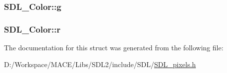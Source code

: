 \subsubsection[{\texorpdfstring{g}{g}}]{ S\+D\+L\+\_\+\+Color\+::g}\hypertarget{struct_s_d_l___color_ae29d881bf740cfa7078b36e07f85d298}{}\label{struct_s_d_l___color_ae29d881bf740cfa7078b36e07f85d298}
\subsubsection[{\texorpdfstring{r}{r}}]{ S\+D\+L\+\_\+\+Color\+::r}\hypertarget{struct_s_d_l___color_a0bb975b6829524133fdd3c6060cfa63d}{}\label{struct_s_d_l___color_a0bb975b6829524133fdd3c6060cfa63d}


The documentation for this struct was generated from the following file\+:\begin{DoxyCompactItemize}
\item 
D\+:/\+Workspace/\+M\+A\+C\+E/\+Libs/\+S\+D\+L2/include/\+S\+D\+L/\hyperlink{_s_d_l__pixels_8h}{S\+D\+L\+\_\+pixels.\+h}\end{DoxyCompactItemize}
